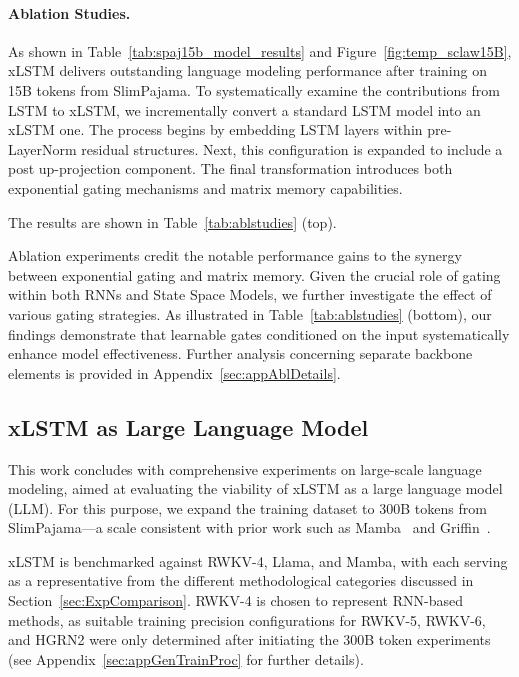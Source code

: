 \paragraph{Ablation Studies.}
As shown in Table~\ref{tab:spaj15b_model_results} and Figure~\ref{fig:temp_sclaw15B}, xLSTM delivers outstanding language modeling performance after training on 15B tokens from SlimPajama. To systematically examine the contributions from LSTM to xLSTM, we incrementally convert a standard LSTM model into an xLSTM one. The process begins by embedding LSTM layers within pre-LayerNorm residual structures. Next, this configuration is expanded to include a post up-projection component. The final transformation introduces both exponential gating mechanisms and matrix memory capabilities.

The results are shown in Table~\ref{tab:ablstudies} (top). 

Ablation experiments credit the notable performance gains to the synergy between exponential gating and matrix memory. Given the crucial role of gating within both RNNs and State Space Models, we further investigate the effect of various gating strategies. As illustrated in Table~\ref{tab:ablstudies} (bottom), our findings demonstrate that learnable gates conditioned on the input systematically enhance model effectiveness. Further analysis concerning separate backbone elements is provided in Appendix~\ref{sec:appAblDetails}.

\subsection{xLSTM as Large Language Model}
\label{sec:ExpLanguage}

This work concludes with comprehensive experiments on large-scale language modeling, aimed at evaluating the viability of xLSTM as a large language model (LLM). For this purpose, we expand the training dataset to 300B tokens from SlimPajama—a scale consistent with prior work such as Mamba~\citep{Gu:24arxiv} and Griffin~\citep{De:24arxiv}.

xLSTM is benchmarked against RWKV-4, Llama, and Mamba, with each serving as a representative from the different methodological categories discussed in Section~\ref{sec:ExpComparison}. RWKV-4 is chosen to represent RNN-based methods, as suitable training precision configurations for RWKV-5, RWKV-6, and HGRN2 were only determined after initiating the 300B token experiments (see Appendix~\ref{sec:appGenTrainProc} for further details). 

